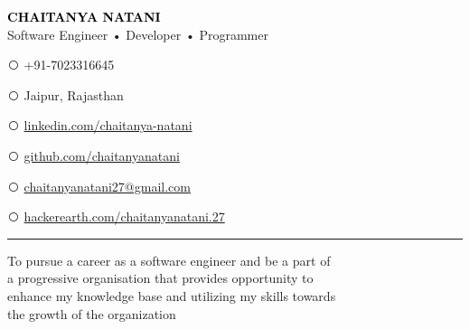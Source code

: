 \documentclass[9pt]{myOwnClass}
\begin{document}
\begin{minipage}[t]{1\textwidth}
	\vspace{-\baselineskip}
	\center\colorbox{white}{\fontsize{48}{40}\textcolor{black}{\textbf{CHAITANYA NATANI}}}\\
	\large Software Engineer • Developer • Programmer\\
\end{minipage}

\vspace{0.2cm}
\def\ci#1{\textcircled{\resizebox{.5em}{!}{#1}}}
\begin{minipage}[t]{0.33\textwidth}
\ci{\faPhone} +91-7023316645\par
\ci{\faHome} Jaipur, Rajasthan\par
\par	
\end{minipage}
\begin{minipage}[t]{0.33\textwidth}
\ci{\faLinkedin} {\href{https://www.linkedin.com/in/chaitanya-natani/}{linkedin.com/chaitanya-natani}}\par
\ci{\faGithub} {\href{https://github.com/chaitanyanatani/}{github.com/chaitanyanatani}}\par
\end{minipage}
\begin{minipage}[t]{0.33\textwidth}
\ci{\faEnvelope} {\href{mailto:chaitanyanatani27@gmail.com}{chaitanyanatani27@gmail.com}}\par
\ci{\faCode} {\href{https://www.hackerearth.com/@chaitanyanatani.27/}{hackerearth.com/chaitanyanatani.27}}\par
\end{minipage}
\vspace{0.02cm}
\par\noindent\rule{\textwidth}{0.4pt}


\begin{minipage}[t]{0.6\textwidth}
	\vspace{-\baselineskip}
	
To pursue a career as a software engineer and be a part of \\a progressive organisation that provides opportunity to \\enhance my knowledge base and utilizing my skills towards\\ the growth of the organization
\end{minipage}
\hfill
\begin{minipage}[t]{0.4\textwidth}
	\vspace{-\baselineskip}
	\begin{barchart}{5.5}
	\end{barchart}
\end{minipage}
\end{document}
